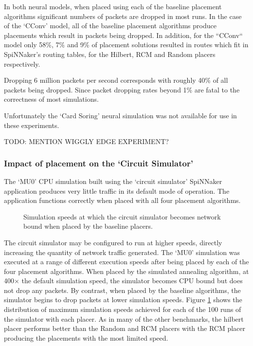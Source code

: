 				In both neural models, when placed using each of the baseline placement
				algorithms significant numbers of packets are dropped in most runs. In
				the case of the `CConv' model, all of the baseline placement algorithms
				produce placements which result in packets being dropped. In addition,
				for the ``CConv`` model only 58\%, 7\% and 9\% of placement solutions
				resulted in routes which fit in SpiNNaker's routing tables, for the
				Hilbert, RCM and Random placers respectively.
				
				Dropping 6 million packets per second corresponds with roughly 40\% of
				all packets being dropped. Since packet dropping rates beyond 1\% are
				fatal to the correctness of most simulations.
				
				Unfortunately the `Card Soring' neural simulation was not available for
				use in these experiments.
				
				TODO: MENTION WIGGLY EDGE EXPERIMENT?
				
			\subsubsection{Impact of placement on the `Circuit Simulator'}
				
				The `MU0' CPU simulation built using the `circuit simulator' SpiNNaker
				application produces very little traffic in its default mode of
				operation. The application functions correctly when placed with all
				four placement algorithms.
				
				\begin{figure}
					\center
					
					\caption{Simulation speeds at which the circuit simulator becomes
					network bound when placed by the baseline placers.}
					\label{fig:mu0-saturation}
				\end{figure}
				
				The circuit simulator may be configured to run at higher speeds,
				directly increasing the quantity of network traffic generated. The
				`MU0' simulation was executed at a range of different execution speeds
				after being placed by each of the four placement algorithms. When
				placed by the simulated annealing algorithm, at 400$\times$ the default
				simulation speed, the simulator becomes CPU bound but does not drop any
				packets. By contrast, when placed by the baseline algorithms, the
				simulator begins to drop packets at lower simulation speeds. Figure
				\ref{fig:mu0-saturation} shows the distribution of maximum simulation
				speeds achieved for each of the 100 runs of the simulator with each
				placer. As in many of the other benchmarks, the hilbert placer performs
				better than the Random and RCM placers with the RCM placer producing
				the placements with the most limited speed.
			

